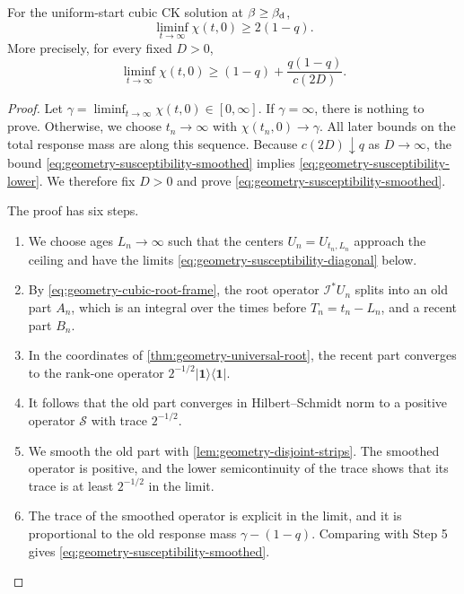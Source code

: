 \begin{theorem}
\label{thm:geometry-susceptibility-lower}
For the uniform-start cubic CK solution at $\beta\ge\beta_{\mathrm d}$,
\begin{equation}
 \liminf_{t\to\infty}\chi(t,0)\ge2(1-q) .
 \label{eq:geometry-susceptibility-lower}
\end{equation}
More precisely, for every fixed $D>0$,
\begin{equation}
 \liminf_{t\to\infty}\chi(t,0)\ge(1-q)+\frac{q(1-q)}{c(2D)} .
 \label{eq:geometry-susceptibility-smoothed}
\end{equation}
\end{theorem}

\begin{proof}
Let $\gamma=\liminf_{t\to\infty}\chi(t,0)\in[0,\infty]$. If $\gamma=\infty$, there is nothing to prove. Otherwise, we choose $t_n\to\infty$ with $\chi(t_n,0)\to\gamma$. All later bounds on the total response mass are along this sequence. Because $c(2D)\downarrow q$ as $D\to\infty$, the bound \eqref{eq:geometry-susceptibility-smoothed} implies \eqref{eq:geometry-susceptibility-lower}. We therefore fix $D>0$ and prove \eqref{eq:geometry-susceptibility-smoothed}.

The proof has six steps.
\begin{enumerate}
\item We choose ages $L_n\to\infty$ such that the centers $U_n=U_{t_n,L_n}$ approach the ceiling and have the limits \eqref{eq:geometry-susceptibility-diagonal} below.
\item By \eqref{eq:geometry-cubic-root-frame}, the root operator $\mathcal I^*U_n$ splits into an old part $A_n$, which is an integral over the times before $T_n=t_n-L_n$, and a recent part $B_n$.
\item In the coordinates of \cref{thm:geometry-universal-root}, the recent part converges to the rank-one operator $2^{-1/2}|\mathbf1\rangle\langle\mathbf1|$.
\item It follows that the old part converges in Hilbert--Schmidt norm to a positive operator $\mathcal S$ with trace $2^{-1/2}$.
\item We smooth the old part with \cref{lem:geometry-disjoint-strips}. The smoothed operator is positive, and the lower semicontinuity of the trace shows that its trace is at least $2^{-1/2}$ in the limit.
\item The trace of the smoothed operator is explicit in the limit, and it is proportional to the old response mass $\gamma-(1-q)$. Comparing with Step 5 gives \eqref{eq:geometry-susceptibility-smoothed}.
\end{enumerate}


\end{proof}
